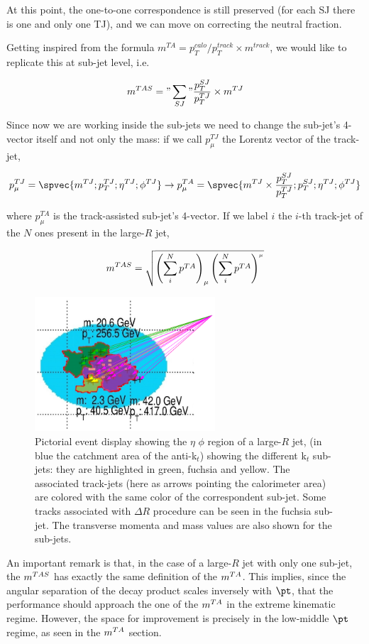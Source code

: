 At this point, the one-to-one correspondence is still preserved (for each SJ there is one and only one TJ), and we can move on correcting the neutral fraction.

Getting inspired from the formula $m^{TA}=p_T^{calo}/p_T^{track}\times m^{track}$, we would like to replicate this at sub-jet level, i.e.

$$m^{TAS}="\sum_{SJ}"\frac{p_T^{SJ}}{p_T^{TJ}}\times m^{TJ}$$

Since now we are working inside the sub-jets we need to change the sub-jet's 4-vector itself and not only the mass: if we call $p_\mu^{TJ}$ the Lorentz vector of the track-jet, 

$$p_\mu^{TJ} = \spvec{m^{TJ};p_T^{TJ};\eta^{TJ};\phi^{TJ}} \to p_\mu^{TA}=\spvec{m^{TJ}\times\frac{p_T^{SJ}}{p_T^{TJ}} ;p_T^{SJ};\eta^{TJ};\phi^{TJ}} $$
 
where $p_\mu^{TA}$ is the track-assisted sub-jet's 4-vector. If we label $i$ the $i$-th track-jet of the $N$ ones present in the large-$R$ jet,

$$ m^{TAS}=\sqrt{\left(\sum_i^N p^{TA} \right)_\mu \left(\sum_i^N p^{TA} \right)^{_\mu}} $$
 
\begin{figure}[!ht]
  \centering
      \includegraphics[width=0.6\textwidth]{jet_part/mtas/mtas.png}
  \caption[Pictorial event display]{Pictorial event display showing the $\eta$ $\phi$ region of a large-$R$ jet, (in blue the catchment area of the anti-k$_t$) showing the different k$_t$ sub-jets: they are highlighted in green, fuchsia and yellow. The associated track-jets (here as arrows pointing the calorimeter area) are colored with the same color of the correspondent sub-jet. Some tracks associated with $\Delta R$ procedure can be seen in the fuchsia sub-jet. The transverse momenta and mass values are also shown for the sub-jets.}
  \label{fig:mtas1}
\end{figure}

An important remark is that, in the case of a large-$R$ jet with only one sub-jet, the $m^{TAS}$ has exactly the same definition of the $m^{TA}$. This implies, since the angular separation of the decay product scales inversely with $\pt$, that the performance should approach the one of the $m^{TA}$ in the extreme kinematic regime. However, the space for improvement is precisely in the low-middle $\pt$ regime, as seen in the $m^{TA}$ section.

